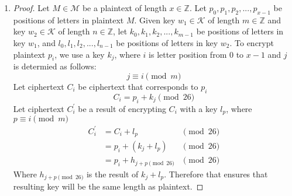 \documentclass[11pt]{article}
\newcommand{\K}{\mathcal{K}}
\newcommand{\M}{\mathcal{M}}
\newcommand{\Z}{\mathbb{Z}}
\theoremstyle{definition}
\begin{document}
\begin{enumerate}
  \item
    \begin{proof}
      Let $M \in \M$ be a plaintext of length $x \in \Z$. Let $p_0, p_1, p_2, ...,p_{x - 1}$ be positions of letters in plaintext $M$. Given key $w_1 \in \K$ of length $m \in \Z$ and key $w_2 \in \K$ of length $n \in \Z$, let $k_0, k_1, k_2, ...,k_{m - 1}$ be positions of letters in key $w_1$, and $l_0, l_1, l_2, ...,l_{n - 1}$ be positions of letters in key $w_2$. To encrypt plaintext $p_i$, we use a key $k_j$, where $i$ is letter position from $0$ to $x - 1$ and $j$ is determied as follows:
      \[
        j \equiv i \pmod m
      \]
      Let ciphertext $C_i$ be ciphertext that corresponds to $p_i$
      \[
        C_i = p_i + k_j \pmod {26}
      \]
      Let ciphertext $C^{'}_i$ be a result of encrypting $C_i$ with a key $l_p$, where $p \equiv i \pmod m$
      \begin{equation*}
      \begin{aligned}
        C^{'}_i &= C_i + l_p &\pmod {26} \\
                &= p_i + (k_j + l_p) &\pmod {26} \\
                &= p_i + h_{j + p \pmod{26}} &\pmod {26}
      \end{aligned}
      \end{equation*}
      Where $h_{j + p \pmod{26}}$ is the result of $k_j + l_p$. Therefore that ensures that resulting key will be the same length as plaintext.
    \end{proof}
\end{enumerate}

\newpage
\end{document}
